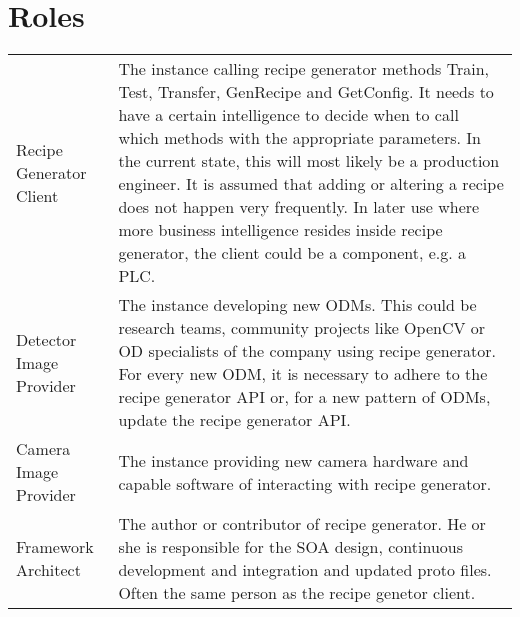 \appendix
\chapter{Roles}
\label{sec:involvedparties}
\extrarowsep=0.6cm\begin{longtabu} to \linewidth{lX}
    Recipe Generator Client & The instance calling recipe generator methods Train, Test, Transfer, GenRecipe and GetConfig. It needs to have a certain intelligence to decide when to call which methods with the appropriate parameters. In the current state, this will most likely be a production engineer. It is assumed that adding or altering a recipe does not happen very frequently. In later use where more business intelligence resides inside recipe generator, the client could be a component, e.g. a PLC.\\ 
    Detector Image Provider & The instance developing new ODMs. This could be research teams, community projects like OpenCV or OD specialists of the company using recipe generator. For every new ODM, it is necessary to adhere to the recipe generator API or, for a new pattern of ODMs, update the recipe generator API.\\
    Camera Image Provider &  	The instance providing new camera hardware and capable software of interacting with recipe generator.\\ 
    Framework Architect & The author or contributor of recipe generator. He or she is responsible for the SOA design, continuous development and integration and updated proto files. Often the same person as the recipe genetor client.
\end{longtabu}


